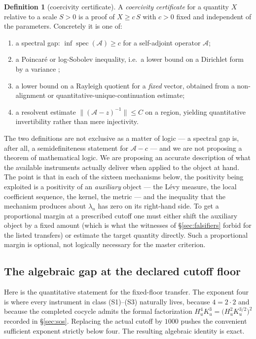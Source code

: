 \documentclass[11pt]{amsart}
\theoremstyle{definition}
\newtheorem{definition}[theorem]{Definition}
\theoremstyle{remark}
\theoremstyle{definition}
\begin{document}
\begin{definition}[coercivity certificate]\label{def:coerc}
A \emph{coercivity certificate} for a quantity $X$ relative to a scale $S>0$ is a proof of
$X\ge c\,S$ with $c>0$ fixed and independent of the parameters. Concretely it is one of:
\begin{enumerate}[label=\textup{(C\arabic*)},leftmargin=*]
\item a spectral gap: $\inf\operatorname{spec}(\mathcal A)\ge c$ for a self-adjoint operator
      $\mathcal A$;
\item a Poincar\'e or log-Sobolev inequality, i.e.\ a lower bound on a Dirichlet form by a
      variance \cite{BGL,Gross};
\item a lower bound on a Rayleigh quotient for a \emph{fixed} vector, obtained from a
      non-alignment or quantitative-unique-continuation estimate;
\item a resolvent estimate $\|(\mathcal A-z)^{-1}\|\le C$ on a region, yielding quantitative
      invertibility rather than mere injectivity.
\end{enumerate}
\end{definition}

The two definitions are not exclusive as a matter of logic --- a spectral gap is, after all, a
semidefiniteness statement for $\mathcal A-c$ --- and we are not proposing a theorem of
mathematical logic. We are proposing an accurate description of what the available instruments
actually deliver when applied to the object at hand. The point is that in each of the sixteen
mechanisms below, the positivity being exploited is a positivity of an \emph{auxiliary}
object --- the L\'evy measure, the local coefficient sequence, the kernel, the metric --- and the
inequality that the mechanism produces about $\lambda_n$ has zero on its right-hand side. To get
a proportional margin at a prescribed cutoff one must either shift the auxiliary object by a
fixed amount (which is what the witnesses of \S\ref{sec:falsifiers} forbid for the listed
transfers) or estimate the target quantity directly.  Such a proportional margin is optional,
not logically necessary for the master criterion.

\subsection{The algebraic gap at the declared cutoff floor}\label{sec:threshold}

Here is the quantitative statement for the fixed-floor transfer. The exponent four is
where every instrument in class (S1)--(S3) naturally lives, because $4=2\cdot2$ and because the
completed cocycle admits the formal factorization
$H_u^4K_u^3=\bigl(H_u^2K_u^{3/2}\bigr)^2$ recorded in \S\ref{sec:sos}. Replacing the actual
cutoff by $1000$ pushes the convenient sufficient exponent strictly below four. The resulting
algebraic identity is exact.
\end{document}
